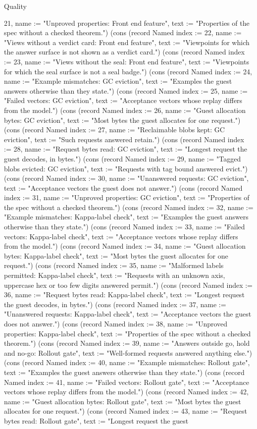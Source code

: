 \begin{lexlean}{Quality}
\begin{semanticmodule}
{21, name := "Unproved properties: Front end feature", text := "Properties of the spec without a checked theorem."}) (cons (record Named {index := 22, name := "Views without a verdict card: Front end feature", text := "Viewpoints for which the answer surface is not shown as a verdict card."}) (cons (record Named {index := 23, name := "Views without the seal: Front end feature", text := "Viewpoints for which the seal surface is not a seal badge."}) (cons (record Named {index := 24, name := "Example mismatches: GC eviction", text := "Examples the guest answers otherwise than they state."}) (cons (record Named {index := 25, name := "Failed vectors: GC eviction", text := "Acceptance vectors whose replay differs from the model."}) (cons (record Named {index := 26, name := "Guest allocation bytes: GC eviction", text := "Most bytes the guest allocates for one request."}) (cons (record Named {index := 27, name := "Reclaimable blobs kept: GC eviction", text := "Such requests answered retain."}) (cons (record Named {index := 28, name := "Request bytes read: GC eviction", text := "Longest request the guest decodes, in bytes."}) (cons (record Named {index := 29, name := "Tagged blobs evicted: GC eviction", text := "Requests with tag bound answered evict."}) (cons (record Named {index := 30, name := "Unanswered requests: GC eviction", text := "Acceptance vectors the guest does not answer."}) (cons (record Named {index := 31, name := "Unproved properties: GC eviction", text := "Properties of the spec without a checked theorem."}) (cons (record Named {index := 32, name := "Example mismatches: Kappa-label check", text := "Examples the guest answers otherwise than they state."}) (cons (record Named {index := 33, name := "Failed vectors: Kappa-label check", text := "Acceptance vectors whose replay differs from the model."}) (cons (record Named {index := 34, name := "Guest allocation bytes: Kappa-label check", text := "Most bytes the guest allocates for one request."}) (cons (record Named {index := 35, name := "Malformed labels permitted: Kappa-label check", text := "Requests with an unknown axis, uppercase hex or too few digits answered permit."}) (cons (record Named {index := 36, name := "Request bytes read: Kappa-label check", text := "Longest request the guest decodes, in bytes."}) (cons (record Named {index := 37, name := "Unanswered requests: Kappa-label check", text := "Acceptance vectors the guest does not answer."}) (cons (record Named {index := 38, name := "Unproved properties: Kappa-label check", text := "Properties of the spec without a checked theorem."}) (cons (record Named {index := 39, name := "Answers outside go, hold and no-go: Rollout gate", text := "Well-formed requests answered anything else."}) (cons (record Named {index := 40, name := "Example mismatches: Rollout gate", text := "Examples the guest answers otherwise than they state."}) (cons (record Named {index := 41, name := "Failed vectors: Rollout gate", text := "Acceptance vectors whose replay differs from the model."}) (cons (record Named {index := 42, name := "Guest allocation bytes: Rollout gate", text := "Most bytes the guest allocates for one request."}) (cons (record Named {index := 43, name := "Request bytes read: Rollout gate", text := "Longest request the guest }
\end{semanticmodule}
\end{lexlean}
